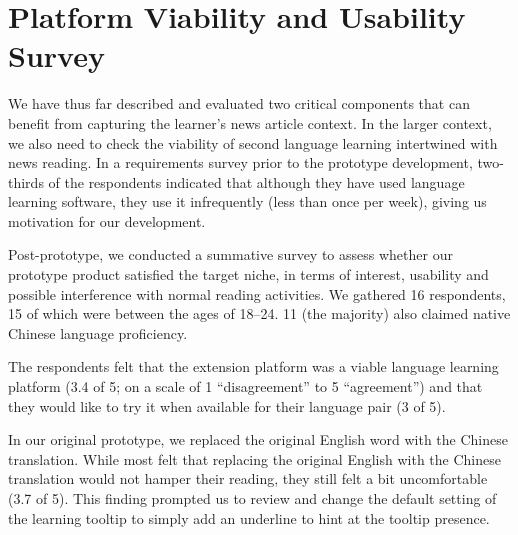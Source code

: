 \section{Platform Viability and Usability Survey}

We have thus far described and evaluated two critical components that
can benefit from capturing the learner's news article context.  In the
larger context, we also need to check the viability of second language
learning intertwined with news reading.  In a requirements survey
prior to the prototype development, two-thirds of the respondents
indicated that although they have used language learning software,
they use it infrequently (less than once per week), giving us motivation for our development.  

Post-prototype, we conducted a summative survey to assess whether our
prototype product satisfied the target niche, in terms of interest,
usability and possible interference with normal reading activities.
We gathered 16 respondents, 15 of which were between the ages of
18--24.  11 (the majority) also claimed native Chinese language
proficiency.  

The respondents felt that the extension platform was a viable language
learning platform (3.4 of 5; on a scale of 1 ``disagreement'' to 
5 ``agreement'') and that they would like to try it when available
for their language pair (3 of 5).

In our original prototype, we replaced the original English word with
the Chinese translation.  While most felt that replacing the original
English with the Chinese translation would not hamper their reading,
they still felt a bit uncomfortable (3.7 of 5).  This finding
prompted us to review and change the default setting of the learning
tooltip to simply add an underline to hint at the tooltip presence.